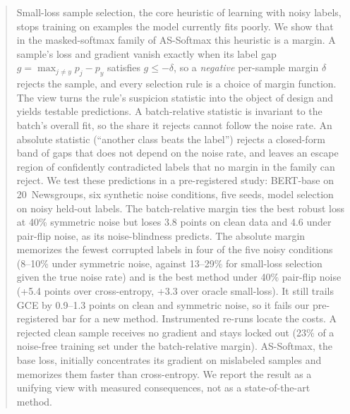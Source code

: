\begin{abstract}
Small-loss sample selection, the core heuristic of learning with noisy labels, stops training on
examples the model currently fits poorly. We show that in the masked-softmax family of AS-Softmax
this heuristic is a margin. A sample's loss and gradient vanish exactly when its label gap
$g = \max_{j\neq y} p_j - p_y$ satisfies $g \le -\delta$, so a \emph{negative} per-sample margin
$\delta$ rejects the sample, and every selection rule is a choice of margin function. The view
turns the rule's suspicion statistic into the object of design and yields testable predictions.
A batch-relative statistic is invariant to the batch's overall fit, so the share it rejects cannot
follow the noise rate. An absolute statistic (``another class beats the label'') rejects a
closed-form band of gaps that does not depend on the noise rate, and leaves an escape region of
confidently contradicted labels that no margin in the family can reject. We test these predictions
in a pre-registered study: BERT-base on 20~Newsgroups, six synthetic noise conditions, five seeds,
model selection on noisy held-out labels. The batch-relative margin ties the best robust loss at
40\% symmetric noise but loses 3.8 points on clean data and 4.6 under pair-flip noise, as its
noise-blindness predicts. The absolute margin memorizes the fewest corrupted labels in four of the
five noisy conditions (8--10\% under symmetric noise, against 13--29\% for small-loss selection
given the true noise rate) and is the best method under 40\% pair-flip noise (+5.4 points over
cross-entropy, +3.3 over oracle small-loss). It still trails GCE by 0.9--1.3 points on clean and symmetric noise, so
it fails our pre-registered bar for a new method. Instrumented re-runs locate the costs. A rejected
clean sample receives no gradient and stays locked out (23\% of a noise-free training set under the
batch-relative margin). AS-Softmax, the base loss, initially concentrates its gradient on
mislabeled samples and memorizes them faster than cross-entropy. We report the result as a unifying
view with measured consequences, not as a state-of-the-art method.
\end{abstract}

